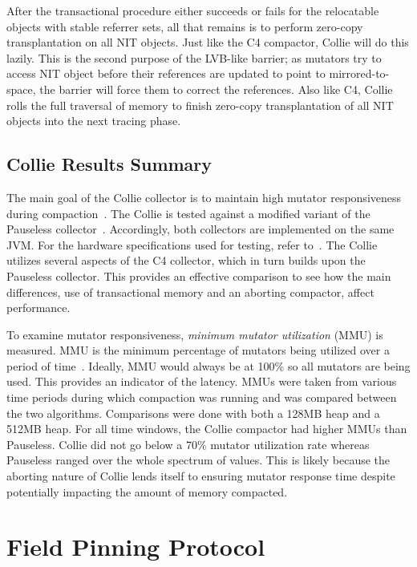 \documentclass{sig-alternate}
\begin{document}
After the transactional procedure either succeeds or fails for the 
relocatable objects with stable referrer sets, all that remains is to perform zero-copy transplantation
on all NIT objects. Just like the C4 compactor, Collie will do this lazily. This is the second purpose
of the LVB-like barrier; as mutators try to access NIT object before their references are updated to
point to mirrored-to-space, the barrier will force them to correct the references. Also like C4, Collie
rolls the full traversal of memory to finish zero-copy transplantation of all NIT objects into the next
tracing phase.

\subsection{Collie Results Summary}
\label{sec:collieResults}

The main goal of the Collie collector is to maintain high mutator responsiveness
during compaction~\cite{Iyengar:Collie}. The Collie is tested 
against a modified variant of the Pauseless collector~\cite{Click:Pauseless}.
Accordingly, both collectors are implemented on the same JVM. For the hardware
specifications used for testing, refer to~\cite{Iyengar:Collie}. The Collie
utilizes several aspects of the C4 collector, which in turn builds upon the Pauseless
collector. This provides an effective comparison to see how the main differences, 
use of transactional memory and an aborting compactor, affect performance. 

To examine mutator responsiveness, \emph{minimum mutator utilization} (MMU) is measured.
MMU is the minimum percentage of mutators being utilized over a period of time~\cite{Bacon:MMU}. Ideally,
MMU would always be at 100\% so all mutators are being used. This provides an indicator
of the latency. MMUs were taken from various time periods during which
compaction was running and was compared between the two algorithms. Comparisons were done
with both a 128MB heap and a 512MB heap. For all time windows, the Collie compactor
had higher MMUs than Pauseless. Collie did not go below a 70\% mutator utilization 
rate whereas Pauseless ranged over the whole spectrum of values. This is 
likely because the aborting nature of Collie
lends itself to ensuring mutator response time despite potentially impacting the
amount of memory compacted.


\section{Field Pinning Protocol}
\label{sec:fpp}
\end{document}
